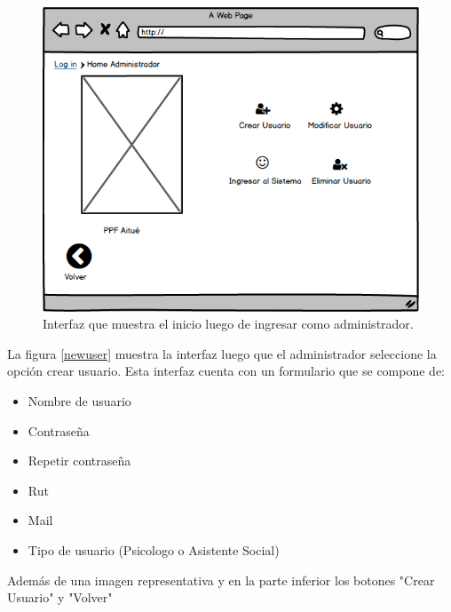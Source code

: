 \begin{figure}[h]
	\label{intadm}
	\begin{center}
		\includegraphics[scale=0.5]{imagenes/intadm.png}
	\end{center}
	\caption{Interfaz que muestra el inicio luego de ingresar como administrador.}
\end{figure}

\clearpage
\newpage

La figura \ref{newuser} muestra la interfaz luego que el administrador seleccione la opción crear usuario. Esta interfaz cuenta con un formulario que se compone de:
\begin{itemize}
	\item Nombre de usuario
	\item Contraseña
	\item Repetir contraseña
	\item Rut
	\item Mail
	\item Tipo de usuario (Psicologo o Asistente Social)
\end{itemize}

Además de una imagen representativa y en la parte inferior  los botones "Crear Usuario" y "Volver"\\

